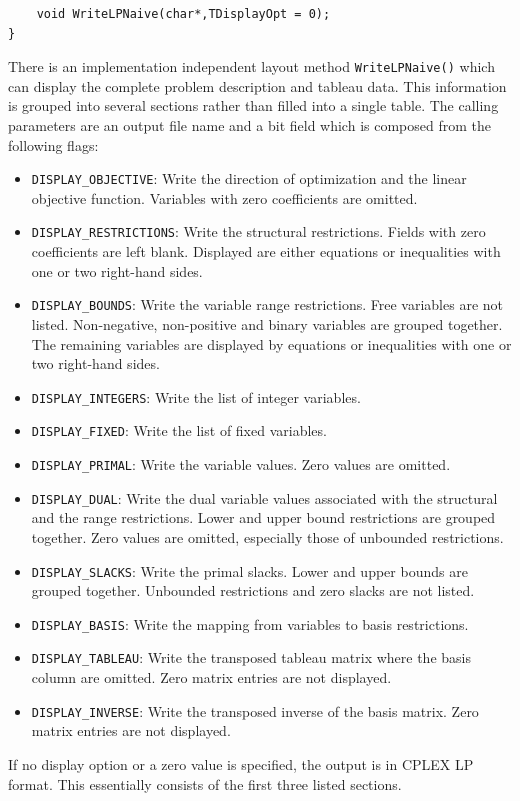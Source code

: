 \documentclass[a4paper,11pt,twoside]{book}
\begin{document}
\begin{multicols}{2}
\begin{mymethods}
\begin{verbatim}
    void WriteLPNaive(char*,TDisplayOpt = 0);
}
\end{verbatim}
\end{mymethods}
There is an implementation independent layout method \verb/WriteLPNaive()/
which can display the complete problem description and tableau data. This
information is grouped into several sections rather than filled into a single
table. The calling parameters are an output file name and a bit field which is
composed from the following flags:
\begin{itemize}
\item \verb/DISPLAY_OBJECTIVE/: Write the direction of optimization and the
    linear objective function. Variables with zero coefficients are omitted.
\item \verb/DISPLAY_RESTRICTIONS/: Write the structural restrictions. Fields
    with zero coefficients are left blank. Displayed are either equations or
    inequalities with one or two right-hand sides.
\item \verb/DISPLAY_BOUNDS/:  Write the variable range restrictions. Free
    variables are not listed. Non-negative, non-positive and binary variables
    are grouped together. The remaining variables are displayed by  equations
    or inequalities with one or two right-hand sides.
\item \verb/DISPLAY_INTEGERS/: Write the list of integer variables.
\item \verb/DISPLAY_FIXED/: Write the list of fixed variables.
\item \verb/DISPLAY_PRIMAL/: Write the variable values. Zero values are omitted.
\item \verb/DISPLAY_DUAL/: Write the dual variable values associated with the
    structural and the range restrictions. Lower and upper bound restrictions
    are grouped together. Zero values are omitted, especially those of
    unbounded restrictions.
\item \verb/DISPLAY_SLACKS/: Write the primal slacks.  Lower and upper bounds
    are grouped together. Unbounded restrictions and zero slacks are not listed.
\item \verb/DISPLAY_BASIS/: Write the mapping from variables to basis
    restrictions. 
\item \verb/DISPLAY_TABLEAU/: Write the transposed tableau matrix where the
    basis column are omitted. Zero matrix entries are not displayed.
\item \verb/DISPLAY_INVERSE/: Write the transposed inverse of the basis matrix.
    Zero matrix entries are not displayed.
\end{itemize}
If no display option or a zero value is specified, the output is in CPLEX LP
format. This essentially consists of the first three listed sections.


\end{multicols}
\end{document}
